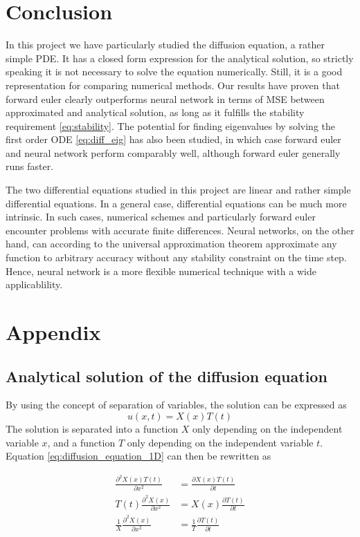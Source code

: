 \documentclass[12pt]{extarticle}
\begin{document}
\section{Conclusion}
In this project we have particularly studied the diffusion equation, a rather simple PDE. It has a closed form expression for the analytical solution, so strictly speaking it is not necessary to solve the equation numerically. Still, it is a good representation for comparing numerical methods. Our results have proven that forward euler clearly outperforms neural network in terms of MSE between approximated and analytical solution, as long as it fulfills the stability requirement \eqref{eq:stability}. The potential for finding eigenvalues by solving the first order ODE \eqref{eq:diff_eig} has also been studied, in which case forward euler and neural network perform comparably well, although forward euler generally runs faster. 

The two differential equations studied in this project are linear and rather simple differential equations. In a general case, differential equations can be much more intrinsic. In such cases, numerical schemes and particularly forward euler encounter problems with accurate finite differences. Neural networks, on the other hand, can according to the universal approximation theorem approximate any function to arbitrary accuracy without any stability constraint on the time step. Hence, neural network is a more flexible numerical technique with a wide applicablility.

\section{Appendix}

\subsection{Analytical solution of the diffusion equation} \label{app:1D_diff_eq}
By using the concept of separation of variables, the solution can be expressed as
\[ u(x,t) = X(x)T(t) \]
The solution is separated into a function $X$ only depending on the independent variable $x$, and a function $T$ only depending on the independent variable $t$. Equation \eqref{eq:diffusion_equation_1D} can then be rewritten as

\begin{align*}
	\frac{\partial^2 X(x)T(t)}{\partial x^2} &= \frac{\partial X(x)T(t)}{\partial t} \\
	T(t)\frac{\partial^2 X(x)}{\partial x^2} &= X(x)\frac{\partial T(t)}{\partial t} \\
	\frac{1}{X}\frac{\partial^2 X(x)}{\partial x^2} &= \frac{1}{T}\frac{\partial T(t)}{\partial t}
\end{align*}
\end{document}
